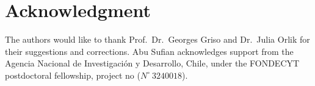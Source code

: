 \documentclass[11pt,a4paper]{article}
\numberwithin{equation}{section}
\def\O{\Omega}
\def\e{\varepsilon}
\def\wh{\widehat }
\def\Gu{{\bf u}}
\def\Gv{{\bf v}}
\newtheorem{lemma}[theorem]{Lemma}
\begin{document}
				
				\section*{Acknowledgment}
				The authors would like to thank Prof.~Dr.~Georges Griso and Dr.~Julia Orlik for their suggestions and corrections. Abu Sufian acknowledges support from the Agencia Nacional de Investigaci\'on y Desarrollo, Chile, under the FONDECYT postdoctoral fellowship,  project no ($N^\circ ~3240018$).
				
				
				
				
				
				{\small
				} %
				
\end{document}
